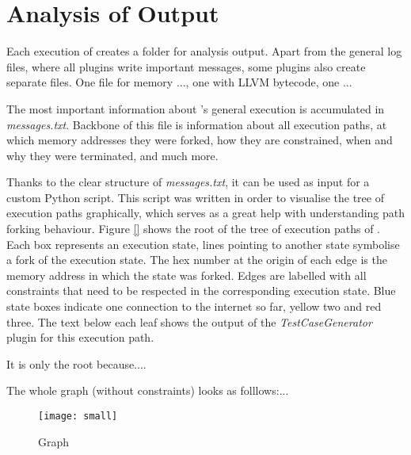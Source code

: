 \section{Analysis of \sse Output}\label{sec:ana}

Each execution of \sse creates a folder for analysis output.
Apart from the general log files, where all plugins write important messages, some plugins also create separate files.
One file for memory ..., one with LLVM bytecode, one ...

The most important information about \sse's general execution is accumulated in \textit{messages.txt}.
Backbone of this file is information about all execution paths, at which memory addresses they were forked, how they are constrained, when and why they were terminated, and much more.

Thanks to the clear structure of \textit{messages.txt}, it can be used as input for a custom Python script. This script was written in order to visualise the tree of execution paths graphically, which serves as a great help with understanding path forking behaviour.
Figure \ref{} shows the root of the tree of execution paths of \app.
Each box represents an execution state, lines pointing to another state symbolise a fork of the execution state.
The hex number at the origin of each edge is the memory address in which the state was forked.
Edges are labelled with all constraints that need to be respected in the corresponding execution state.
Blue state boxes indicate one connection to the internet so far, yellow two and red three.
The text below each leaf shows the output of the \textit{TestCaseGenerator} plugin for this execution path.

It is only the root because....

The whole graph (without constraints) looks as folllows:...

\begin{figure}
\texttt{[image: small]}
\caption{Graph}
\label{fig:tree}
\end{figure}



\iffalse
§6	Interpretation of S2E analysis output
		> Execution Traces
		> Gefundene Privacy-Probleme
		> Eventuell nicht gefundene Sachen
		> Probleme bei der Analyse
\fi